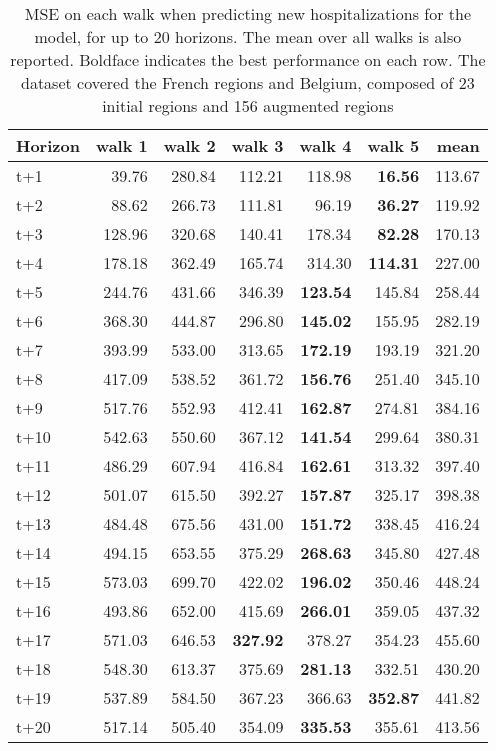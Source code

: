 \begin{table}[H]
\centering
\caption{MSE on each walk when predicting new hospitalizations for the model, for up to 20 horizons. The mean over all walks is also reported. Boldface indicates the best performance on each row. The dataset covered the French regions and Belgium, composed of 23 initial regions and 156 augmented regions }
\label{tab:MSE_walk_dense_model}
\begin{tabular}{lrrrrrr}
\toprule
Horizon &  walk 1 &  walk 2 &  walk 3 &  walk 4 &  walk 5 &   mean \\
\midrule
t+1  & 39.76  & 280.84  & 112.21  & 118.98  & \textbf{16.56}  & 113.67  \\
t+2  & 88.62  & 266.73  & 111.81  & 96.19  & \textbf{36.27}  & 119.92  \\
t+3  & 128.96  & 320.68  & 140.41  & 178.34  & \textbf{82.28}  & 170.13  \\
t+4  & 178.18  & 362.49  & 165.74  & 314.30  & \textbf{114.31}  & 227.00  \\
t+5  & 244.76  & 431.66  & 346.39  & \textbf{123.54}  & 145.84  & 258.44  \\
t+6  & 368.30  & 444.87  & 296.80  & \textbf{145.02}  & 155.95  & 282.19  \\
t+7  & 393.99  & 533.00  & 313.65  & \textbf{172.19}  & 193.19  & 321.20  \\
t+8  & 417.09  & 538.52  & 361.72  & \textbf{156.76}  & 251.40  & 345.10  \\
t+9  & 517.76  & 552.93  & 412.41  & \textbf{162.87}  & 274.81  & 384.16  \\
t+10  & 542.63  & 550.60  & 367.12  & \textbf{141.54}  & 299.64  & 380.31  \\
t+11  & 486.29  & 607.94  & 416.84  & \textbf{162.61}  & 313.32  & 397.40  \\
t+12  & 501.07  & 615.50  & 392.27  & \textbf{157.87}  & 325.17  & 398.38  \\
t+13  & 484.48  & 675.56  & 431.00  & \textbf{151.72}  & 338.45  & 416.24  \\
t+14  & 494.15  & 653.55  & 375.29  & \textbf{268.63}  & 345.80  & 427.48  \\
t+15  & 573.03  & 699.70  & 422.02  & \textbf{196.02}  & 350.46  & 448.24  \\
t+16  & 493.86  & 652.00  & 415.69  & \textbf{266.01}  & 359.05  & 437.32  \\
t+17  & 571.03  & 646.53  & \textbf{327.92}  & 378.27  & 354.23  & 455.60  \\
t+18  & 548.30  & 613.37  & 375.69  & \textbf{281.13}  & 332.51  & 430.20  \\
t+19  & 537.89  & 584.50  & 367.23  & 366.63  & \textbf{352.87}  & 441.82  \\
t+20  & 517.14  & 505.40  & 354.09  & \textbf{335.53}  & 355.61  & 413.56  \\

\bottomrule
\end{tabular}
\end{table}
